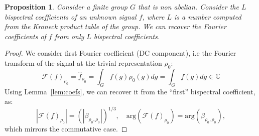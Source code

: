 \documentclass{article}
\newtheorem{proposition}{Proposition}
\begin{document}
\begin{proposition}
    Consider a finite group $G$ that is non abelian. Consider the $L$ bispectral coefficients of an unknown signal $f$, where $L$ is a number computed from the Kroneck product table of the group. We can recover the Fourier coefficients of $f$ from only $L$ bispectral coefficients.
\end{proposition}


\begin{proof}
    We consider first Fourier coefficient (DC component), i.e the Fourier transform of the signal at the trivial representation $\rho_0$:
    \begin{equation}
    \mathcal{F}(f)_{\rho_0} = \hat{f}_{\rho_0} = \int_G f(g)\rho_0(g) dg = \int_G f(g) dg \in \mathbb{C}
     \end{equation}
    Using Lemma~\ref{lem:coefs}, we can recover it from the ``first'' bispectral coefficient, as:
    \begin{equation}
        | \mathcal{F}(f)_{\rho_0}| = \left(|\beta_{\rho_0, \rho_0}|\right)^{1/3},
        \quad
        \text{arg}(\mathcal{F}(f)_{\rho_0}) = \text{arg}(\beta_{\rho_0, \rho_0}),
    \end{equation}
    which mirrors the commutative case.


\end{proof}
\end{document}
